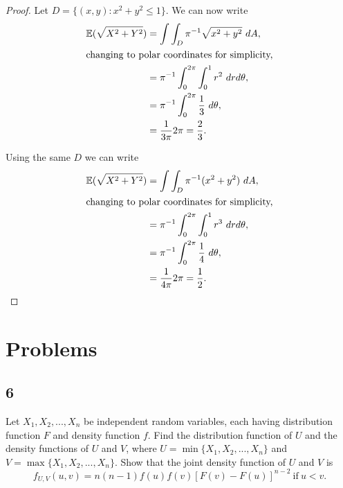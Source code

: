 \documentclass{article}
\newcommand{\E}[1]{\mathbb{E}(#1)}
\begin{document}
\begin{proof}
    Let $D = \{(x,y): x^2 + y^2 \leq 1\}$. We can now write
    \begin{align*}
        \E{\sqrt{X^2+Y^2}} & = \int\int_D \pi^{-1}\sqrt{x^2+y^2} \ dA,        \\
        \intertext{changing to polar coordinates for simplicity,}
                           & = \pi^{-1}\int_0^{2\pi}\int_0^1 r^2 \ drd\theta, \\
                           & = \pi^{-1}\int_0^{2\pi}\frac{1}{3} \ d\theta,    \\
                           & = \frac{1}{3\pi}2\pi = \frac{2}{3}.
    \end{align*}

    Using the same $D$ we can write
    \begin{align*}
        \E{\sqrt{X^2+Y^2}} & = \int\int_D \pi^{-1}(x^2+y^2) \ dA,             \\
        \intertext{changing to polar coordinates for simplicity,}
                           & = \pi^{-1}\int_0^{2\pi}\int_0^1 r^3 \ drd\theta, \\
                           & = \pi^{-1}\int_0^{2\pi}\frac{1}{4} \ d\theta,    \\
                           & = \frac{1}{4\pi}2\pi = \frac{1}{2}.
    \end{align*}
\end{proof}


\section*{Problems}
\subsection*{6}
Let $X_1, X_2,...,X_n$ be independent random variables, each having
distribution function $F$ and density function $f$. Find the distribution
function of $U$ and the density functions of $U$ and $V$, where
$U = \min\{X_1,X_2,...,X_n\}$ and $V = \max\{X_1, X_2,...,X_n\}$.
Show that the joint density function of $U$ and $V$ is
\begin{equation*}
    f_{U,V}(u,v) = n(n-1)f(u)f(v)[F(v)-F(u)]^{n-2} \ \text{if} \ u < v.
\end{equation*}
\end{document}
